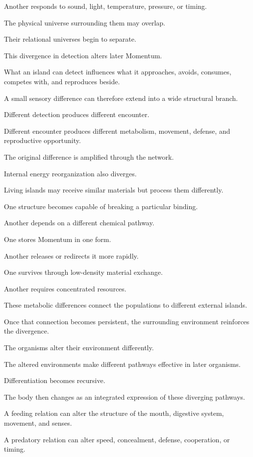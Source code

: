 Another responds to sound, light, temperature, pressure, or timing.

The physical universe surrounding them may overlap.

Their relational universes begin to separate.

This divergence in detection alters later Momentum.

What an island can detect influences what it approaches, avoids, consumes, competes with, and reproduces beside.

A small sensory difference can therefore extend into a wide structural branch.

Different detection produces different encounter.

Different encounter produces different metabolism, movement, defense, and reproductive opportunity.

The original difference is amplified through the network.

Internal energy reorganization also diverges.

Living islands may receive similar materials but process them differently.

One structure becomes capable of breaking a particular binding.

Another depends on a different chemical pathway.

One stores Momentum in one form.

Another releases or redirects it more rapidly.

One survives through low-density material exchange.

Another requires concentrated resources.

These metabolic differences connect the populations to different external islands.

Once that connection becomes persistent, the surrounding environment reinforces the divergence.

The organisms alter their environment differently.

The altered environments make different pathways effective in later organisms.

Differentiation becomes recursive.

The body then changes as an integrated expression of these diverging pathways.

A feeding relation can alter the structure of the mouth, digestive system, movement, and senses.

A predatory relation can alter speed, concealment, defense, cooperation, or timing.

